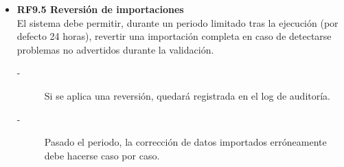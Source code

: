 \begin{itemize}
    \item \textbf{RF9.5 Reversión de importaciones} \\
    El sistema debe permitir, durante un periodo limitado tras la ejecución
    (por defecto 24 horas), revertir una importación completa en caso de
    detectarse problemas no advertidos durante la validación.
    \begin{description}
        \item[-] Si se aplica una reversión, quedará registrada en el log de auditoría. 
        \item[-] Pasado el periodo, la corrección de datos importados erróneamente
        debe hacerse caso por caso.
    \end{description}
\end{itemize}
